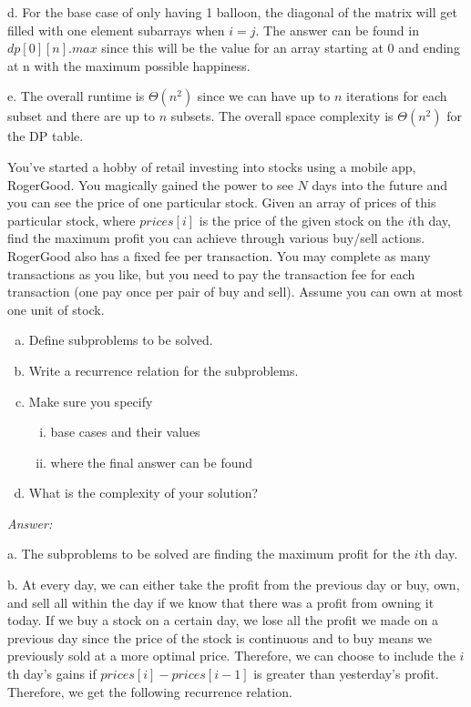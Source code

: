 \documentclass[12pt]{article}
\newenvironment{problem}[2][Problem]{\begin{trivlist}
\item[\hskip \labelsep {\bfseries #1}\hskip \labelsep {\bfseries #2.}]}{\end{trivlist}}
\begin{document}
d. For the base case of only having 1 balloon, the diagonal of the matrix will get filled with one element subarrays when $i=j$. The answer can be found in $dp[0][n].max$ since this will be the value for an array starting at 0 and ending at n with the maximum possible happiness.

e. The overall runtime is $\Theta(n^2)$ since we can have up to $n$ iterations for each subset and there are up to $n$ subsets. The overall space complexity is $\Theta(n^2)$ for the DP table.
\begin{problem}{4}
    You've started a hobby of retail investing into stocks using a mobile app, RogerGood. You magically gained the power to see $N$ days into the future and you can see the price of one particular stock. Given an array of prices of this particular stock, where $prices[i]$ is the price of the given stock on the $i$th day, find the maximum profit you can achieve through various buy/sell actions. RogerGood also has a fixed fee per transaction. You may complete as many transactions as you like, but you need to pay the transaction fee for each transaction (one pay once per pair of buy and sell). Assume you can own at most one unit of stock.    
    \begin{enumerate}[a.]
        \item Define subproblems to be solved.
        \item Write a recurrence relation for the subproblems.
        \item Make sure you specify
        \begin{enumerate}[i.]
            \item base cases and their values
            \item where the final answer can be found
        \end{enumerate}
        \item What is the complexity of your solution?
    \end{enumerate}
\end{problem}

\textit{Answer:}

a. The subproblems to be solved are finding the maximum profit for the $i$th day.

b. At every day, we can either take the profit from the previous day or buy, own, and sell all within the day if we know that there was a profit from owning it today. If we buy a stock on a certain day, we lose all the profit we made on a previous day since the price of the stock is continuous and to buy means we previously sold at a more optimal price. Therefore, we can choose to include the $i$th day's gains if $prices[i]-prices[i-1]$ is greater than yesterday's profit. Therefore, we get the following recurrence relation.
\end{document}
